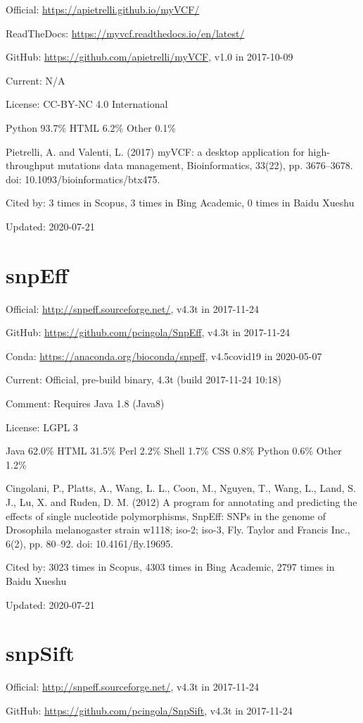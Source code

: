 \documentclass[]{article}
\newcommand{\cb}[3]{\par Cited by: {\color{blue}\Huge #1} times in Scopus, {\color{blue}\Huge #2} times in Bing Academic, {\color{blue}\Huge #3} times in Baidu Xueshu}
\begin{document}
Official: \url{https://apietrelli.github.io/myVCF/}

ReadTheDocs: \url{https://myvcf.readthedocs.io/en/latest/}

GitHub: \url{https://github.com/apietrelli/myVCF}, v1.0 in 2017-10-09

Current: N/A

License: CC-BY-NC 4.0 International

Python 93.7\% HTML 6.2\% Other 0.1\%

Pietrelli, A. and Valenti, L. (2017) myVCF: a desktop application for high-throughput mutations data management, Bioinformatics, 33(22), pp. 3676–3678. doi: 10.1093/bioinformatics/btx475.\cb{3}{3}{0}

Updated: 2020-07-21
\section{snpEff}

Official: \url{http://snpeff.sourceforge.net/}, v4.3t in 2017-11-24

GitHub: \url{https://github.com/pcingola/SnpEff}, v4.3t in 2017-11-24

Conda: \url{https://anaconda.org/bioconda/snpeff}, v4.5covid19 in 2020-05-07

Current: Official, pre-build binary, 4.3t (build 2017-11-24 10:18)

Comment: Requires Java 1.8 (Java8)

License: LGPL 3

Java 62.0\% HTML 31.5\% Perl 2.2\% Shell 1.7\% CSS 0.8\% Python 0.6\% Other 1.2\%

Cingolani, P., Platts, A., Wang, L. L., Coon, M., Nguyen, T., Wang, L., Land, S. J., Lu, X. and Ruden, D. M. (2012) A program for annotating and predicting the effects of single nucleotide polymorphisms, SnpEff: SNPs in the genome of Drosophila melanogaster strain w1118; iso-2; iso-3, Fly. Taylor and Francis Inc., 6(2), pp. 80–92. doi: 10.4161/fly.19695.\cb{3023}{4303}{2797}

Updated: 2020-07-21

\section{snpSift}

Official: \url{http://snpeff.sourceforge.net/}, v4.3t in 2017-11-24

GitHub: \url{https://github.com/pcingola/SnpSift}, v4.3t in 2017-11-24
\end{document}
